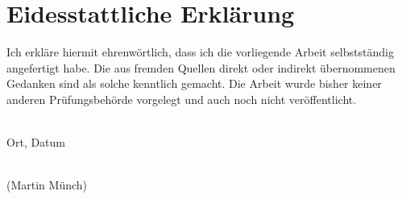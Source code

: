 \documentclass[Bachelorarbeit.tex]{subfiles}
\begin{document}
\chapter*{Eidesstattliche Erklärung}
Ich erkläre hiermit ehrenwörtlich, dass ich die vorliegende Arbeit selbstständig angefertigt habe. Die aus fremden Quellen direkt oder indirekt übernommenen Gedanken sind als solche kenntlich gemacht. Die Arbeit wurde bisher keiner anderen Prüfungsbehörde vorgelegt und auch noch nicht veröffentlicht.
\vspace*{5cm}

\noindent
\begin{minipage}[h]{0.4\linewidth}
	\begin{center}
		\dotfill\\
		Ort, Datum
	\end{center}
\end{minipage}
\hspace*{0.1\linewidth}
\begin{minipage}[h]{0.5\linewidth}
	\begin{center}
		\dotfill\\
		(Martin Münch)
	\end{center}
\end{minipage}
\end{document}
